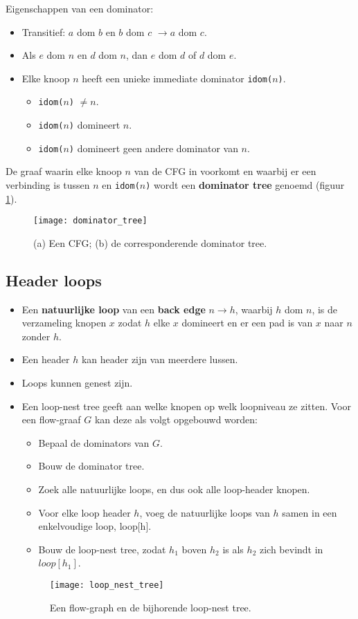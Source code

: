Eigenschappen van een dominator:
\begin{itemize}
	\item Transitief: $a$ dom $b$ en $b$ dom $c$ $\rightarrow a$ dom $c$.
	\item Als $e$ dom $n$ en $d$ dom $n$, dan $e$ dom $d$ of $d$ dom $e$.
	\item Elke knoop $n$ heeft een unieke immediate dominator \texttt{idom($n$)}.
	\begin{itemize}
		\item \texttt{idom($n$)} $\neq n$.
		\item \texttt{idom($n$)} domineert $n$.
		\item \texttt{idom($n$)} domineert geen andere dominator van $n$.
	\end{itemize}
\end{itemize}

De graaf waarin elke knoop $n$ van de CFG in voorkomt en waarbij er een verbinding is tussen $n$ en \texttt{idom($n$)} wordt een \textbf{dominator tree} genoemd (figuur \ref{fig:dominator_tree}).

\begin{figure}[ht]
	\centering
	\texttt{[image: dominator\_tree]}
	\caption{(a) Een CFG; (b) de corresponderende dominator tree.}
	\label{fig:dominator_tree}
\end{figure}

\subsection{Header loops}
\begin{itemize}
	\item Een \textbf{natuurlijke loop} van een \textbf{back edge} $n \rightarrow h$, waarbij $h$ dom $n$, is de verzameling knopen $x$ zodat $h$ elke $x$ domineert en er een pad is van $x$ naar $n$ zonder $h$.
	\item Een header $h$ kan header zijn van meerdere lussen.
	\item Loops kunnen genest zijn.
	\item Een loop-nest tree geeft aan welke knopen op welk loopniveau ze zitten. Voor een flow-graaf $G$ kan deze als volgt opgebouwd worden:
	\begin{itemize}
		\item Bepaal de dominators van $G$.
		\item Bouw de dominator tree.
		\item Zoek alle natuurlijke loops, en dus ook alle loop-header knopen.
		\item Voor elke loop header $h$, voeg de natuurlijke loops van $h$ samen in een enkelvoudige loop, loop[h].
		\item Bouw de loop-nest tree, zodat $h_1$ boven $h_2$ is als $h_2$ zich bevindt in $loop[h_1]$.
	\end{itemize}
	\begin{figure}[ht]
		\centering
		\texttt{[image: loop\_nest\_tree]}
		\caption{Een flow-graph en de bijhorende loop-nest tree.}
		\label{fig:loop_nest_tree}
	\end{figure}

\end{itemize}

